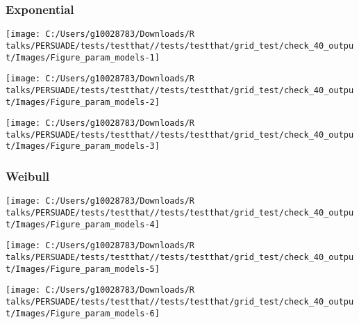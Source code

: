 \documentclass[
]{article}
\begin{document}
\clearpage

\clearpage

\subsubsection{Exponential}\label{exponential}

\begin{flushleft}\texttt{[image: C:/Users/g10028783/Downloads/R talks/PERSUADE/tests/testthat//tests/testthat/grid\_test/check\_40\_output/Images/Figure\_param\_models-1]} \end{flushleft}

\begin{flushleft}\texttt{[image: C:/Users/g10028783/Downloads/R talks/PERSUADE/tests/testthat//tests/testthat/grid\_test/check\_40\_output/Images/Figure\_param\_models-2]} \end{flushleft}

\begin{flushleft}\texttt{[image: C:/Users/g10028783/Downloads/R talks/PERSUADE/tests/testthat//tests/testthat/grid\_test/check\_40\_output/Images/Figure\_param\_models-3]} \end{flushleft}

\clearpage

\subsubsection{Weibull}\label{weibull}

\begin{flushleft}\texttt{[image: C:/Users/g10028783/Downloads/R talks/PERSUADE/tests/testthat//tests/testthat/grid\_test/check\_40\_output/Images/Figure\_param\_models-4]} \end{flushleft}

\begin{flushleft}\texttt{[image: C:/Users/g10028783/Downloads/R talks/PERSUADE/tests/testthat//tests/testthat/grid\_test/check\_40\_output/Images/Figure\_param\_models-5]} \end{flushleft}

\begin{flushleft}\texttt{[image: C:/Users/g10028783/Downloads/R talks/PERSUADE/tests/testthat//tests/testthat/grid\_test/check\_40\_output/Images/Figure\_param\_models-6]} \end{flushleft}
\end{document}
